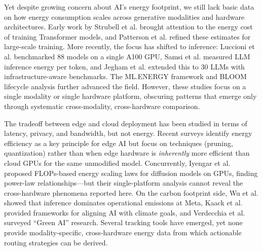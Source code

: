\documentclass[11pt]{article}
\begin{document}
Yet despite growing concern about AI's energy footprint\cite{verdecchia2023systematic,wu2022sustainable,kaack2022aligning}, we still lack basic data on how energy consumption scales across generative modalities and hardware architectures. Early work by Strubell et al.\cite{strubell2019energy} brought attention to the energy cost of training Transformer\cite{vaswani2017attention} models, and Patterson et al.\cite{patterson2021carbon} refined these estimates for large-scale training. More recently, the focus has shifted to inference: Luccioni et al.\cite{luccioni2024power} benchmarked 88 models on a single A100 GPU, Samsi et al.\cite{samsi2023words} measured LLM inference energy per token, and Jegham et al.\cite{jegham2025hungry} extended this to 30 LLMs with infrastructure-aware benchmarks. The ML.ENERGY framework\cite{you2023zeus} and BLOOM lifecycle analysis\cite{luccioni2023bloom} further advanced the field. However, these studies focus on a single modality or single hardware platform\cite{dodge2022measuring}, obscuring patterns that emerge only through systematic cross-modality, cross-hardware comparison.

The tradeoff between edge and cloud deployment has been studied in terms of latency, privacy, and bandwidth\cite{mao2024green,xu2024edge}, but not energy. Recent surveys\cite{mao2024green} identify energy efficiency as a key principle for edge AI but focus on techniques (pruning, quantization) rather than when edge hardware is \textit{inherently} more efficient than cloud GPUs for the same unmodified model. Concurrently, Iyengar et al.\cite{castano2025energy} proposed FLOPs-based energy scaling laws for diffusion models on GPUs, finding power-law relationships---but their single-platform analysis cannot reveal the cross-hardware phenomena reported here. On the carbon footprint side, Wu et al.\cite{wu2022sustainable} showed that inference dominates operational emissions at Meta, Kaack et al.\cite{kaack2022aligning} provided frameworks for aligning AI with climate goals, and Verdecchia et al.\cite{verdecchia2023systematic} surveyed ``Green AI'' research\cite{schwartz2020green}. Several tracking tools have emerged\cite{henderson2020towards,lacoste2019quantifying,anthony2020carbontracker,garcia2019estimation}, yet none provide modality-specific, cross-hardware energy data from which actionable routing strategies can be derived.
\end{document}
